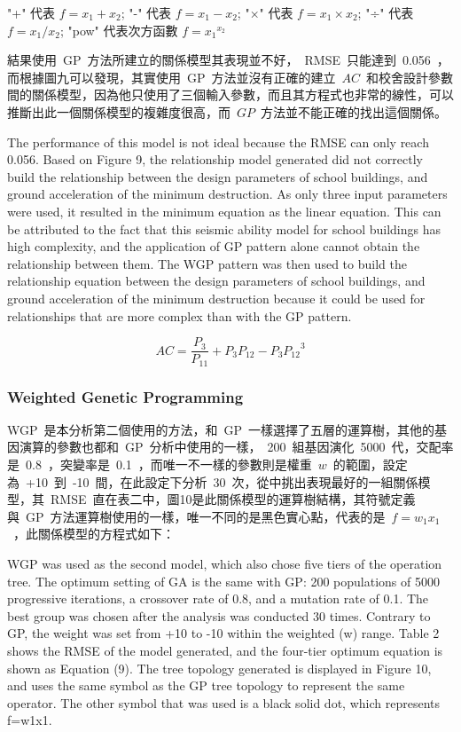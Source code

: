 "+" 代表 $f = x_1 + x_2$;
"-" 代表 $f = x_1 - x_2$;
"×" 代表 $f = x_1 \times x_2$;
"÷" 代表 $f = x_1 / x_2$;
"pow" 代表次方函數 $f = {x_1} ^ {x_2}$

結果使用~GP~方法所建立的關係模型其表現並不好，~RMSE~只能達到~0.056~，而根據圖九可以發現，其實使用~GP~方法並沒有正確的建立~$AC$~和校舍設計參數間的關係模型，因為他只使用了三個輸入參數，而且其方程式也非常的線性，可以推斷出此一個關係模型的複雜度很高，而~$GP$~方法並不能正確的找出這個關係。

The performance of this model is not ideal because the RMSE can only reach 0.056. Based on Figure 9, the relationship model generated did not correctly build the relationship between the design parameters of school buildings, and ground acceleration of the minimum destruction. As only three input parameters were used, it resulted in the minimum equation as the linear equation. This can be attributed to the fact that this seismic ability model for school buildings has high complexity, and the application of GP pattern alone cannot obtain the relationship between them. The WGP pattern was then used to build the relationship equation between the design parameters of school buildings, and ground acceleration of the minimum destruction because it could be used for relationships that are more complex than with the GP pattern.

\begin{equation} AC = \dfrac{P_3}{P_{11}} + P_3 P_{12} - P_3 {P_{12}}^3  \label{eq:GP_AC}\end{equation}

\subsubsection{Weighted Genetic Programming}

WGP~是本分析第二個使用的方法，和~GP~一樣選擇了五層的運算樹，其他的基因演算的參數也都和~GP~分析中使用的一樣，~200~組基因演化~5000~代，交配率是~0.8~，突變率是~0.1~，而唯一不一樣的參數則是權重~$w$~的範圍，設定為~+10~到~-10~間，在此設定下分析~30~次，從中挑出表現最好的一組關係模型，其~RMSE~直在表二中，圖10是此關係模型的運算樹結構，其符號定義與~GP~方法運算樹使用的一樣，唯一不同的是黑色實心點，代表的是~$f = w_1x_1$~，此關係模型的方程式如下：

WGP was used as the second model, which also chose five tiers of the operation tree. The optimum setting of GA is the same with GP: 200 populations of 5000 progressive iterations, a crossover rate of 0.8, and a mutation rate of 0.1. The best group was chosen after the analysis was conducted 30 times. Contrary to GP, the weight was set from +10 to -10 within the weighted (w) range. Table 2 shows the RMSE of the model generated, and the four-tier optimum equation is shown as Equation (9). The tree topology generated is displayed in Figure 10, and uses the same symbol as the GP tree topology to represent the same operator. The other symbol that was used is a black solid dot, which represents f=w1x1.

